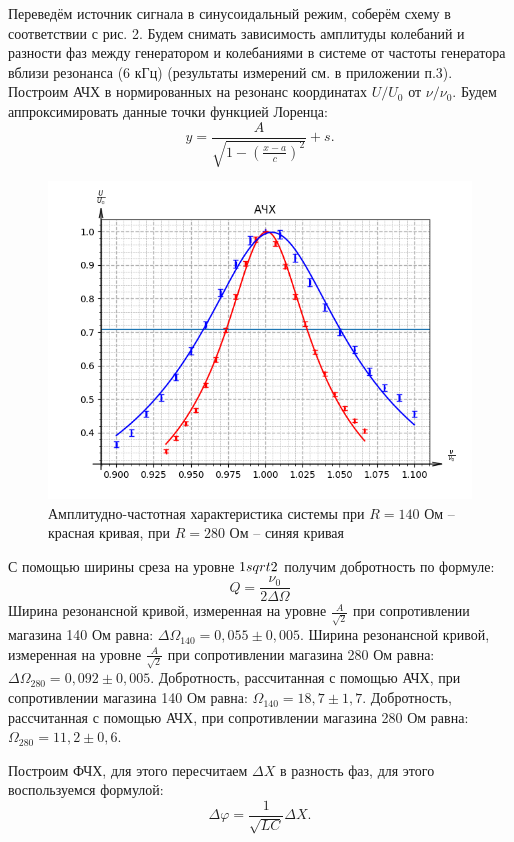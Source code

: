 \documentclass[a4paper,12pt]{extarticle}
\begin{document}
Переведём источник сигнала в синусоидальный режим, соберём схему в соответствии с рис. 2. Будем снимать зависимость амплитуды колебаний и разности фаз между генератором и колебаниями в системе от частоты генератора вблизи резонанса (6 кГц) (результаты измерений см. в приложении п.3). Построим АЧХ в нормированных на резонанс координатах $U/U_0$ от $\nu/\nu_0$. Будем аппроксимировать данные точки функцией Лоренца:
$$y = \frac{A}{\sqrt{1-(\frac{x-a}{c})^2}} + s.$$
\begin{figure}[h!]
    \centering
    \includegraphics[width=0.8\linewidth]{ACHH.png}
    \caption{Амплитудно-частотная характеристика системы при $R = 140$ Ом -- красная кривая, при $R = 280$ Ом -- синяя кривая}
\end{figure}

С помощью ширины среза на уровне $1\\sqrt{2}$ получим добротность по формуле:
\begin{equation}
    Q = \frac{\nu_0}{2 \Delta \Omega}
\end{equation}
Ширина резонансной кривой, измеренная на уровне $\frac{A}{\sqrt{2}}$ при сопротивлении магазина 140 Ом равна: $\Delta \Omega_\text{140} = 0,055 \pm 0,005.$
Ширина резонансной кривой, измеренная на уровне $\frac{A}{\sqrt{2}}$ при сопротивлении магазина 280 Ом равна: $\Delta \Omega_\text{280} = 0,092 \pm 0,005.$
Добротность, рассчитанная с помощью АЧХ, при сопротивлении магазина 140 Ом равна: $\Omega_\text{140} = 18,7 \pm 1,7.$
Добротность, рассчитанная с помощью АЧХ, при сопротивлении магазина 280 Ом равна: $\Omega_\text{280} = 11,2 \pm 0,6.$

Построим ФЧХ, для этого пересчитаем $\Delta X$ в разность фаз, для этого воспользуемся формулой:
\begin{equation}
    \Delta \varphi = \frac{1}{\sqrt{LC}} \Delta X.
\end{equation}
\end{document}
